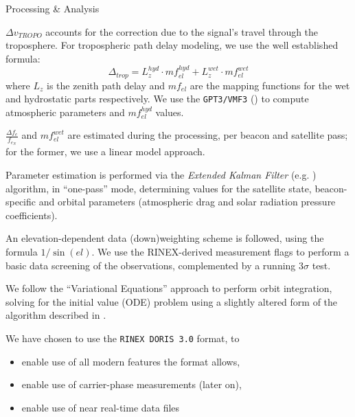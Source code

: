 \documentclass[final,a0,portrait]{beamer}
\newlength{\onecolwid}
\begin{document}
\begin{frame}[t]
\begin{columns}[t]
\begin{column}{\onecolwid}
\begin{block}{Processing \& Analysis}
{\begin{description}
  \item $\Delta v_{TROPO}$ accounts for the correction due to the signal's travel 
  through the troposphere. For tropospheric path delay modeling, we use the 
  well established formula:
  \begin{equation}
    \Delta _{trop} = L_{z}^{hyd} \cdot mf_{el}^{hyd} + L_{z}^{wet} \cdot mf_{el}^{wet}
  \end{equation}
  where $L_{z}$ is the zenith path delay and $mf_{el}$ are the mapping functions 
  for the wet and hydrostatic parts respectively. We use the \texttt{GPT3/VMF3} 
  (\cite{Landskron2018}) to compute atmospheric parameters and $mf_{el}^{hyd}$ 
  values.

\end{description}

$\frac{\Delta f_e}{f_{e_N}}$ and $mf_{el}^{wet}$ are estimated during the 
processing, per beacon and satellite pass; for the former, we use a linear 
model approach. \hfill \break

Parameter estimation is performed via the \emph{Extended Kalman Filter} 
(e.g. \cite{ZHOU20201700}) algorithm, in ``one-pass'' mode, determining 
values for the satellite state, beacon-specific and orbital parameters 
(atmospheric drag and solar radiation pressure coefficients). \hfill \break

An elevation-dependent data (down)weighting scheme is followed, using the 
formula $1 / \sin (el)$. We use the RINEX-derived measurement flags to perform 
a basic data screening of the observations, complemented by a running 
$3\sigma$ test. \hfill \break

We follow the ``Variational Equations'' approach to perform orbit integration, 
solving for the initial value (ODE) problem using a slightly altered form of 
the algorithm described in \cite{alma992703343902959}. \hfill \break

We have chosen to use the \texttt{RINEX DORIS 3.0} format, to 
\begin{itemize}
  \item enable use of all modern features the format allows,
  \item enable use of carrier-phase measurements (later on),
  \item enable use of near real-time data files
\end{itemize}
}

\end{block}


\end{column}
\end{columns}
\end{frame}
\end{document}
